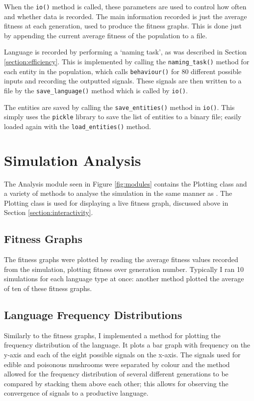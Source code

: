 \documentclass[12pt,a4paper,twoside,openright]{report}
\begin{document}
When the \texttt{io()} method is called, these parameters are used to control how often and whether data is recorded. The main information recorded is just the average fitness at each generation, used to produce the fitness graphs. This is done just by appending the current average fitness of the population to a file.

Language is recorded by performing a `naming task', as was described in Section \ref{section:efficiency}. This is implemented by calling the \texttt{naming\_task()} method for each entity in the population, which calls \texttt{behaviour()} for 80 different possible inputs and recording the outputted signals. These signals are then written to a file by the \texttt{save\_language()} method which is called by \texttt{io()}.

The entities are saved by calling the \texttt{save\_entities()} method in \texttt{io()}. This simply uses the \texttt{pickle} library to save the list of entities to a binary file; easily loaded again with the \texttt{load\_entities()} method.

\section{Simulation Analysis}\label{section:impl-analysis}

The Analysis module seen in Figure \ref{fig:modules} contains the Plotting class and a variety of methods to analyse the simulation in the same manner as \citet{Cangelosi1998}. The Plotting class is used for displaying a live fitness graph, discussed above in Section \ref{section:interactivity}.

\subsection{Fitness Graphs}

The fitness graphs were plotted by reading the average fitness values recorded from the simulation, plotting fitness over generation number. Typically I ran 10 simulations for each language type at once: another method plotted the average of ten of these fitness graphs.

\subsection{Language Frequency Distributions}

Similarly to the fitness graphs, I implemented a method for plotting the frequency distribution of the language. It plots a bar graph with frequency on the y-axis and each of the eight possible signals on the x-axis. The signals used for edible and poisonous mushrooms were separated by colour and the method allowed for the frequency distribution of several different generations to be compared by stacking them above each other; this allows for observing the convergence of signals to a productive language.
\end{document}
